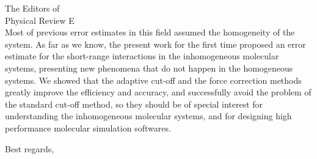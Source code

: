 \documentclass{letter}
\begin{document}
\begin{letter}{
    The Editors of\\
    Physical Review E\\
    \vskip 1cm
  }
Most of previous error estimates in this field assumed the homogeneity
of the system. As far as we know, the present work for the first time
proposed an error estimate for the short-range interactions in the
inhomogeneous molecular systems, presenting new phenomena that do not
happen in the homogeneous systems.  We showed that the adaptive cut-off
and the force correction methods greatly improve the efficiency and
accuracy, and successfully avoid the problem of the standard cut-off
method, so they should be of special interest for
understanding the inhomogeneous molecular systems, and for
designing high
performance molecular simulation softwares.
\\
\vskip 3cm

\closing{Best regards,}


\end{letter} 
\end{document}
